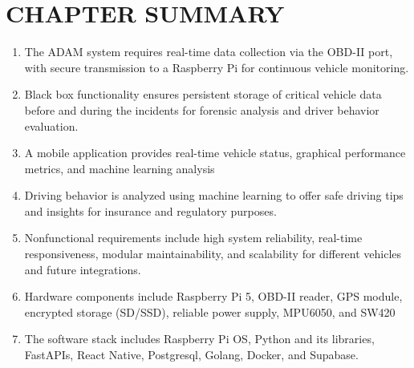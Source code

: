 \section{CHAPTER SUMMARY}
\begin{enumerate}
    \item{The ADAM system requires real-time data collection via the OBD-II port, with secure transmission to a Raspberry Pi for continuous vehicle monitoring.}
    \item{Black box functionality ensures persistent storage of critical vehicle data before and during the incidents for forensic analysis and driver behavior evaluation.}
    \item{A mobile application provides real-time vehicle status, graphical performance metrics, and machine learning analysis}
    \item{Driving behavior is analyzed using machine learning to offer safe driving tips and insights for insurance and regulatory purposes.}
    \item{Nonfunctional requirements include high system reliability, real-time responsiveness, modular maintainability, and scalability for different vehicles and future integrations.}
    \item{Hardware components include Raspberry Pi 5, OBD-II reader, GPS module, encrypted storage (SD/SSD), reliable power supply, MPU6050, and SW420 }
    \item{The software stack includes Raspberry Pi OS, Python and its libraries, FastAPIs, React Native, Postgresql, Golang, Docker, and Supabase.}
\end{enumerate}